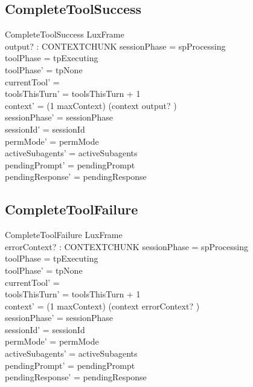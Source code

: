 \documentclass[a4paper,10pt,fleqn]{article}
\begin{document}
\subsection{CompleteToolSuccess}

\begin{schema}{CompleteToolSuccess}
  LuxFrame \\
  output? : CONTEXTCHUNK
  \where
  sessionPhase = spProcessing \\
  toolPhase = tpExecuting \\
  toolPhase' = tpNone \\
  currentTool' = \emptyset \\
  toolsThisTurn' = toolsThisTurn + 1 \\
  context' = (1 \upto maxContext) \dres (context \cat \langle output? \rangle) \\
  sessionPhase' = sessionPhase \\
  sessionId' = sessionId \\
  permMode' = permMode \\
  activeSubagents' = activeSubagents \\
  pendingPrompt' = pendingPrompt \\
  pendingResponse' = pendingResponse
\end{schema}

\subsection{CompleteToolFailure}

\begin{schema}{CompleteToolFailure}
  LuxFrame \\
  errorContext? : CONTEXTCHUNK
  \where
  sessionPhase = spProcessing \\
  toolPhase = tpExecuting \\
  toolPhase' = tpNone \\
  currentTool' = \emptyset \\
  toolsThisTurn' = toolsThisTurn + 1 \\
  context' = (1 \upto maxContext) \dres (context \cat \langle errorContext? \rangle) \\
  sessionPhase' = sessionPhase \\
  sessionId' = sessionId \\
  permMode' = permMode \\
  activeSubagents' = activeSubagents \\
  pendingPrompt' = pendingPrompt \\
  pendingResponse' = pendingResponse
\end{schema}
\end{document}

